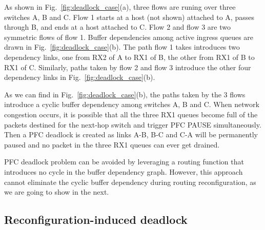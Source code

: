 As shown in Fig.~\ref{fig:deadlock_case}(a), three flows are runing over three switches A, B and C. Flow 1 starts at a host (not shown) attached to A, passes through B, and ends at a host attached to C. Flow 2 and flow 3 are two symmetric flows of flow 1. Buffer dependencies among active ingress queues are drawn in Fig.~\ref{fig:deadlock_case}(b). The path flow 1 takes introduces two dependency links, one from RX2 of A to RX1 of B, the other from RX1 of B to RX1 of C. Similarly, paths taken by flow 2 and flow 3 introduce the other four dependency links in Fig.~\ref{fig:deadlock_case}(b).

As we can find in Fig.~\ref{fig:deadlock_case}(b), the paths taken by the 3 flows introduce a cyclic buffer dependency among switches A, B and C. When network congestion occurs, it is possible that all the three RX1 queues become full of the packets destined for the next-hop switch and trigger PFC PAUSE simultaneously. Then a PFC deadlock is created as links A-B, B-C and C-A will be permanently paused and no packet in the three RX1 queues can ever get drained.

PFC deadlock problem can be avoided by leveraging a routing function that introduces no cycle in the buffer dependency graph. However, this approach cannot eliminate the cyclic buffer dependency during routing reconfiguration, as we are going to show in the next.

\subsection{Reconfiguration-induced deadlock}\label{subsec:reconfigdeadlock}

